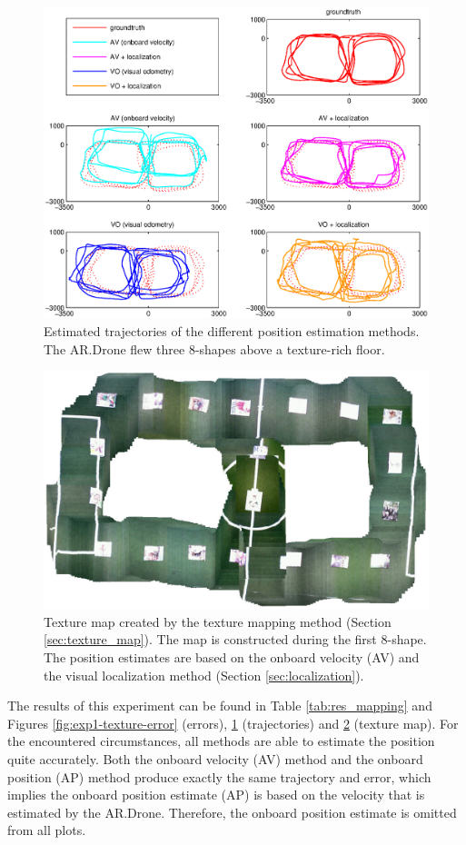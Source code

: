 \begin{figure}[htb!]
\centering
\includegraphics[width=\linewidth,trim=2cm 1.5cm 2cm 2cm]{images/exp1-run13-path.eps}
\caption{Estimated trajectories of the different position estimation methods. The AR.Drone flew three 8-shapes above a texture-rich floor.}
\label{fig:exp1-texture-path}
\end{figure}

\begin{figure}[htb!]
\centering
\includegraphics[width=0.75\linewidth]{images/exp1-run13-map.jpg}
\caption{Texture map created by the texture mapping method (Section \ref{sec:texture_map}). The map is constructed during the first 8-shape. The position estimates are based on the onboard velocity (AV) and the visual localization method (Section \ref{sec:localization}).}
\label{fig:exp1-texture-map}
\end{figure}

The results of this experiment can be found in Table \ref{tab:res_mapping} and Figures \ref{fig:exp1-texture-error} (errors), \ref{fig:exp1-texture-path} (trajectories) and \ref{fig:exp1-texture-map} (texture map).
For the encountered circumstances, all methods are able to estimate the position quite accurately.
Both the onboard velocity (AV) method and the onboard position (AP) method produce exactly the same trajectory and error, which implies the onboard position estimate (AP) is based on the velocity that is estimated by the AR.Drone.
Therefore, the onboard position estimate is omitted from all plots.

